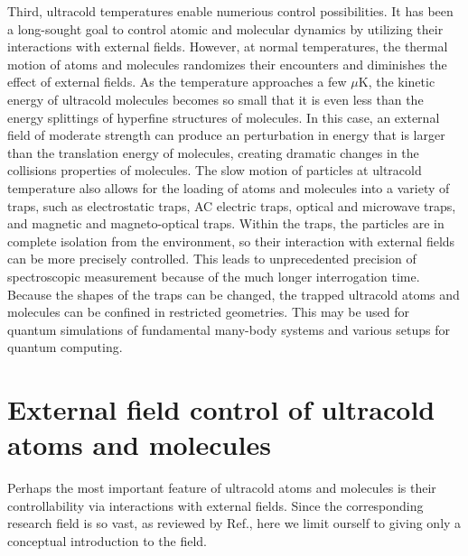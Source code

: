 Third, ultracold temperatures enable numerious control possibilities. It has been a long-sought goal to control atomic and 
molecular dynamics by utilizing their interactions with external fields. However, at normal temperatures, the thermal 
motion of atoms and molecules randomizes their encounters and diminishes the effect of external fields. As the temperature
approaches a few $\mu$K, the kinetic energy of ultracold molecules becomes so small  that it is even less than 
the energy splittings of hyperfine structures of molecules. In this case, an external field of moderate strength can produce an perturbation
in energy that is larger than the translation energy of molecules, creating dramatic changes in the collisions properties of
molecules\cite{krems2005}. The 
slow motion of particles at ultracold temperature also allows for the loading of atoms and molecules into a variety of 
traps, such as electrostatic traps\cite{bethlem2000}, AC electric traps\cite{vanVeldhoven2005}, optical and microwave
traps\cite{optical-lattice-review, deMille2004}, and magnetic and magneto-optical traps\cite{hogan2008, 
vanhaecke2002, wang2004}. Within the traps, the particles are in complete isolation from the environment, so their
interaction with external fields can be more precisely controlled. This leads to unprecedented precision of 
spectroscopic measurement because of the much longer  interrogation time\cite{vandeMeerakker2005, 
gilijamse2007, campbell2008}. Because the shapes of the traps can be changed, the trapped ultracold atoms and 
molecules can be confined in restricted geometries. This may be used for quantum simulations of 
fundamental many-body systems\cite{Baranov2012} and various setups for quantum computing\cite{brennen1999,
jaksch1999, pachos2003, kay2004, micheli2006, buchler2007a, bloch2008}.  


\section{External field control of ultracold atoms and molecules}
\label{sec:control}
Perhaps the most important feature of ultracold atoms and molecules is their controllability via interactions with  
external fields. Since the corresponding research field is so vast, as reviewed by Ref.\cite{lemoshko2013}, 
here we limit ourself to giving only a conceptual introduction to the field. 

